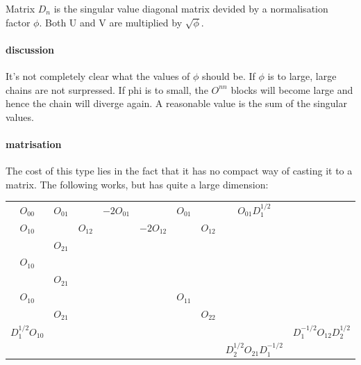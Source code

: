 Matrix $D_n$ is the singular value diagonal matrix devided by a normalisation factor $\phi$. Both U and V are multiplied by $  \sqrt{\phi} $.


\paragraph{discussion}
It's not completely clear what the values of $\phi$ should be.  If $\phi$ is to large, large chains are not surpressed. If phi is to small, the $O^{n n}$ blocks will become large and hence the chain will diverge again. A reasonable value is the sum of the singular values. 

\paragraph{matrisation}
The cost of this type lies in the fact that it has no compact way of casting it to a matrix. The following works, but has quite a large dimension:

\begin{tabular}{ccc|cc|cc|cc}
    $O_{00}$               & $O_{01} $   &             & $-2  O_{01}$ &                & $ O_{01}$ &             & $ O_{01}  D_1^{1/2}$           &                                \\
    ${O_{10}}$             &             & ${ O_{12}}$ &              & $-2 { O_{12}}$ &           & ${ O_{12}}$ &                                &                                \\
                           & ${ O_{21}}$ &             &              &                &           &             &                                &                                \\
    \hline
    ${O_{10}}$             &             &             &              &                &           &             &                                &                                \\
                           & ${ O_{21}}$ &             &              &                &           &             &                                &                                \\
    \hline
    ${ O_{10}}$            &             &             &              &                & $O_{11}$  &             &                                &                                \\
                           & ${ O_{21}}$ &             &              &                &           & $O_{22}$    &                                &                                \\
    \hline
    $ D_1^{1/2} { O_{10}}$ &             &             &              &                &           &             &                                & $D_1^{-1/2} O_{12}  D_2^{1/2}$ \\
                           &             &             &              &                &           &             & $ D_2^{1/2} O_{21} D_1^{-1/2}$                                  \\\end{tabular}

